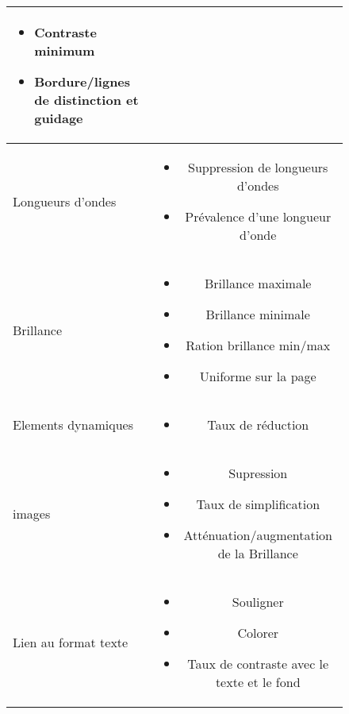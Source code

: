 \documentclass[french,a4paper]{report}
\begin{document}
{\begin{figure}[H]
\begin{center}
\begin{tabular}{| l | c |}
\begin{minipage}{8cm}
\begin{itemize}\item Contraste minimum
\item Bordure/lignes de distinction et guidage
\medskip\end{itemize}\end{minipage}\\
\hline
Longueurs d'ondes & \begin{minipage}{8cm}\medskip
\begin{itemize}\item Suppression de longueurs d'ondes
\item Prévalence d'une longueur d'onde
\medskip\end{itemize}\end{minipage}\\
\hline
Brillance & \begin{minipage}{8cm}\medskip
\begin{itemize}\item Brillance maximale
\item Brillance minimale
\item Ration brillance min/max
\item Uniforme sur la page
\medskip\end{itemize}\end{minipage}\\
\hline
Elements dynamiques & \begin{minipage}{8cm}\medskip
\begin{itemize}\item Taux de réduction
\medskip\end{itemize}\end{minipage}\\
\hline
images & \begin{minipage}{8cm}\medskip
\begin{itemize}\item Supression
\item Taux de simplification
\item Atténuation/augmentation de la Brillance
\medskip\end{itemize}\end{minipage}\\
\hline
Lien au format texte & \begin{minipage}{8cm}\medskip
\begin{itemize}\item Souligner
\item Colorer
\item Taux de contraste avec le texte et le fond

\end{itemize}
\end{minipage}
\end{tabular}
\end{center}
\end{figure}}
\end{document}
